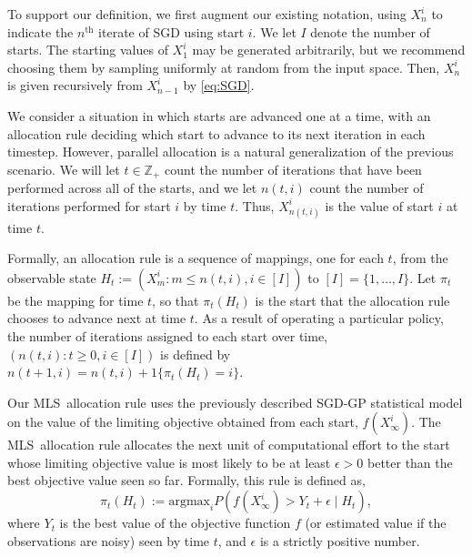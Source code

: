 \documentclass[12pt,english]{article}
\newcommand{\argmax}{\mathrm{argmax}}
\newcommand{\stedit}[1]{{\color{blue} #1}}
\newcommand{\abbrv}{MLS}
\begin{document}
To support our definition, we first augment our existing notation, using $X_n^i$ to indicate the $n^{\mathrm{th}}$ iterate of SGD using start $i$.   We let $I$ denote the number of starts.
The starting values of $X^i_1$ may be generated arbitrarily, but we recommend choosing them by sampling uniformly at random from the input space.  Then, $X^i_n$ is given recursively from $X^i_{n-1}$ by \eqref{eq:SGD}.

We consider a situation in which starts are advanced one at a time, with an allocation rule deciding which start to advance to its next iteration in each timestep. \stedit{However, parallel allocation is a natural generalization of the previous scenario.}
We will let $t \in \mathbb{Z}_+$ count the number of iterations that have been performed across all of the starts, and we let $n(t,i)$ count the number of iterations performed for start $i$ by time $t$.
Thus, $X_{n(t,i)}^i$ is the value of start $i$ at time $t$.

Formally, an allocation rule is a sequence of mappings, one for each $t$, from the observable state $H_t := (X^i_m : m \le n(t,i), i \in [I])$ to $[I] = \{1,\ldots,I\}$.  Let $\pi_t$ be the mapping for time $t$, so that $\pi_t(H_t)$ is the start that the allocation rule chooses to advance next at time $t$.  As a result of operating a particular policy, the number of iterations assigned to each start over time, $(n(t,i) : t\ge 0, i \in [I])$ is defined by $n(t+1,i) = n(t,i) + 1\{\pi_t(H_t) = i\}$.

Our \abbrv\ allocation rule uses the previously described SGD-GP statistical model on the value of the limiting objective obtained from each start, $f(X^i_\infty)$. The \abbrv\ allocation rule allocates the next unit of computational effort to the start whose limiting objective value is most likely to be at least $\epsilon>0$ better than the best objective value seen so far.
Formally, this rule is defined as,
\begin{equation*}
\pi_t(H_t) := \argmax_i 
P\left(f\left(X_{\infty}^{i}\right)>Y_t+\epsilon\mid H_{t}\right),
\end{equation*}
where $Y_t$ is the best value of the objective function $f$ \stedit{(or estimated value if the observations are noisy)} seen by time $t$, and $\epsilon$ is a strictly positive number. 
\end{document}
